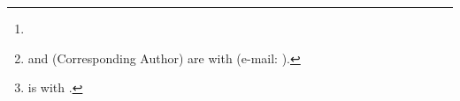 \documentclass[journal,10pt,twocolumn]{../../packages/publishers/ieee/IEEEtran}
\title{\PaperTitle}
\author{\AuthorA,~\IEEEmembership{\RoleA,}
        \AuthorB,~\IEEEmembership{\RoleB,}
        and~\AuthorC,~\IEEEmembership{\RoleC}%
\thanks{\GrantFunding}%
\thanks{\AuthorA{} and \AuthorB{} (Corresponding Author) are with \AffilA{} (e-mail: \EmailB).}%
\thanks{\AuthorC{} is with \AffilB{}.}%
}
\begin{document}
\maketitle

\begin{abstract}
\PaperAbstract
\end{abstract}

\begin{IEEEkeywords}
\PaperKeywords
\end{IEEEkeywords}









\end{document}
